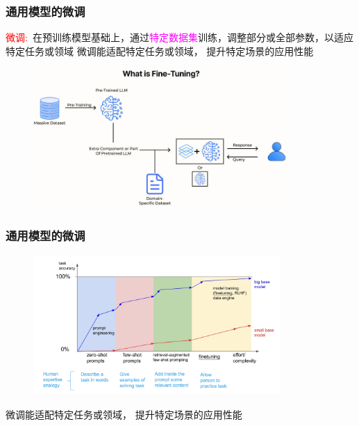 \begin{frame}
    \frametitle{通用模型的微调}
    \textcolor{red}{微调:}~在预训练模型基础上，通过\textcolor{magenta}{特定数据集}训练，调整部分或全部参数，以适应特定任务或领域
微调能适配特定任务或领域，{\fontsize{7.2pt}{6.2pt}\selectfont{(如法律文书分析、医疗诊断助手)}} 提升特定场景的应用性能
\begin{figure}[h!]
\vspace*{-0.05in}
\centering
\includegraphics[height=2.1in, width=3.8in, viewport=0 0 220 120,clip]{Figures/What-is-Fine-Tuning.jpg}
\label{What-is-Fine-Tuning}
\end{figure}
\vskip -0.15in
\end{frame}

\begin{frame}
    \frametitle{通用模型的微调}
\begin{figure}[h!]
\vspace*{-0.10in}
\centering
\includegraphics[height=2.1in, width=3.7in, viewport=0 0 790 460,clip]{Figures/Human_expertise_analogy.png}
\label{Human_expertise_analogy}
\end{figure}
\vskip -0.05in
微调能适配特定任务或领域，{\fontsize{7.2pt}{6.2pt}\selectfont{(如法律文书分析、医疗诊断助手)}} 提升特定场景的应用性能
\end{frame}

